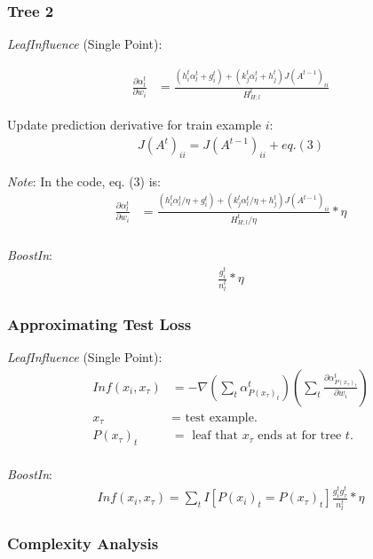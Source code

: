 \documentclass[12pt]{article}
\begin{document}
\subsubsection*{Tree 2}

\emph{LeafInfluence} (Single Point):

\begin{align}
\frac{\partial \alpha_l^t}{\partial w_i} &= \frac{(h_i^t \alpha_l^t + g_i^t) + (k_j^t \alpha_l^t + h_j^t) J(A^{t-1})_{ii}}{H_{H;l}^t}
\end{align}

Update prediction derivative for train example $i$:
\begin{align*}
J(A^t)_{ii} = J(A^{t-1})_{ii} + eq. (3)
\end{align*}

\emph{Note}: In the code, eq. (3) is:
\begin{align}
\frac{\partial \alpha_l^t}{\partial w_i} &= \frac{(h_i^t \alpha_l^t / \eta + g_i^t) + (k_j^t \alpha_l^t / \eta + h_j^t) J(A^{t-1})_{ii}}{H_{H;l}^t / \eta} * \eta \nonumber
\end{align}
\\
\emph{BoostIn}:
\begin{align}
\frac{g_i^t}{n_l^t} * \eta \nonumber
\end{align}

\subsubsection*{Approximating Test Loss}

\emph{LeafInfluence} (Single Point):
\begin{align*}
Inf(x_i, x_\tau) &= -\nabla \left(\sum_t \alpha_{P(x_\tau)_t}^t\right) \left(\sum_t \frac{\partial \alpha_{P(x_\tau)_t}^t}{\partial w_i}\right)
\\
x_\tau &= \text{ test example.}
\\
P(x_\tau)_t &= \text{ leaf that $x_\tau$ ends at for tree $t$.}
\end{align*}
\\
\emph{BoostIn}:
\begin{align*}
Inf(x_i, x_\tau) = \sum_t I[P(x_i)_t = P(x_\tau)_t] \frac{g_i^t g_\tau^t}{n_l^t} * \eta
\end{align*}

\subsubsection*{Complexity Analysis}
\end{document}
